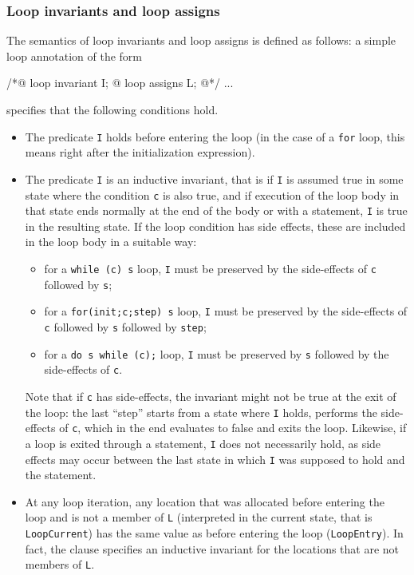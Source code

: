 \subsubsection{Loop invariants and loop assigns}
\label{sec:loop-invariants}
The semantics of loop invariants and loop assigns is defined as follows: 
a simple loop annotation of the form
\begin{listing}{1}
/*@ loop invariant I;
  @ loop assigns L;
  @*/
...
\end{listing}
specifies that the following conditions hold.
\begin{itemize}
\item The predicate \lstinline|I| holds before entering the loop
  (in the case of a
  \lstinline|for| loop, this means right after the initialization expression).
\item The predicate \lstinline|I| is an inductive invariant, that is
  if \lstinline|I| is assumed true in some state where the condition
  \lstinline|c| is also true, and if execution of the loop body in
  that state ends normally at the end of the body or with a
  \Continue statement, \lstinline|I| is true in the
  resulting state. 
  If the loop condition has side effects, these are
  included in the loop body in a suitable way:
  \begin{itemize}
  \item for a \lstinline|while (c) s| loop, \lstinline|I| must be
    preserved by the side-effects of \lstinline|c| followed by
    \lstinline|s|;
  \item for a \lstinline|for(init;c;step) s| loop, \lstinline|I| must
    be preserved by the side-effects of \lstinline|c| followed by
    \lstinline|s| followed by \lstinline|step|;
  \item for a \lstinline|do s while (c);| loop, \lstinline|I| must be
    preserved by \lstinline|s| followed by the side-effects of
    \lstinline|c|.
  \end{itemize}
Note that if \lstinline|c| has side-effects, the invariant might not
be true at the exit of the loop: the last ``step'' starts from a state
where \lstinline|I| holds, performs the side-effects of \lstinline|c|,
which in the end evaluates to false and exits the loop. Likewise, if a
loop is exited through a \Break statement, \lstinline|I|
does not necessarily hold, as side effects may occur between
the last state in which \lstinline|I| was supposed to hold and 
the \Break statement.

\item At any loop iteration, any location that was allocated before
  entering the loop and is not a member of \lstinline|L| (interpreted in the
  current state, that is \lstinline|LoopCurrent|) has the same value as
  before entering the loop (\lstinline|LoopEntry|).
  In fact, the \Loop \assigns clause specifies an inductive
  invariant for the locations that are not members of \lstinline|L|.
\end{itemize}

